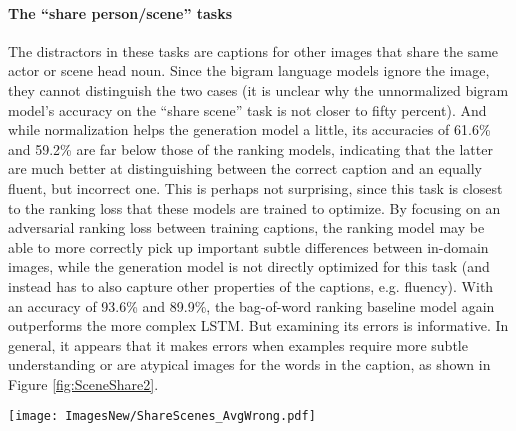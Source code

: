 \documentclass[11pt]{article}
\begin{document}
\paragraph{The ``share person/scene'' tasks}
The distractors in these tasks are captions for other images that share the same actor or scene head noun. Since the bigram language models ignore the image, they cannot distinguish the two cases (it is unclear why the unnormalized bigram model's accuracy on the ``share scene'' task is not closer to fifty percent). And while normalization helps the generation model a little, its accuracies of 61.6\% and 59.2\% are far below those of the ranking models, indicating that the latter are much better at distinguishing between the correct caption and an equally fluent, but incorrect one.
This is perhaps not surprising, since this task is closest to the ranking loss that these models are trained to optimize. By focusing on an adversarial  ranking loss between training captions, the ranking model may be able to more correctly pick up important subtle differences between in-domain images, while the generation model is not directly optimized for this task (and instead has to also capture other properties of the captions, e.g. fluency). 
With an accuracy of 93.6\% and 89.9\%, the bag-of-word ranking baseline model again outperforms the more complex LSTM.
But examining its errors is informative. In general, it appears that it makes errors when examples require more subtle understanding or are atypical images for the words in the caption, as shown in Figure \ref{fig:SceneShare2}.

\begin{figure*}[!tb]
\centering \texttt{[image: ImagesNew/ShareScenes\_AvgWrong.pdf]} 
\caption{Examples from the  ``share scene''  task that the BOW ranking model gets wrong, together with its scores for each of the captions.} 
\label{fig:SceneShare2} 
\end{figure*}

 
\end{document}
